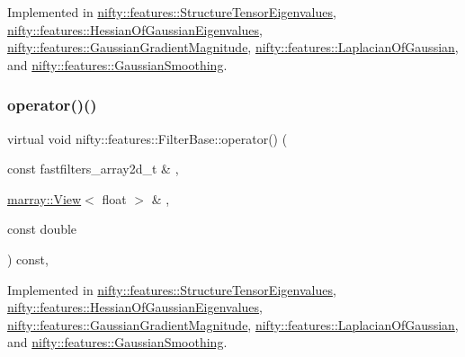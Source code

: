 Implemented in \hyperlink{structnifty_1_1features_1_1StructureTensorEigenvalues_aca7d1180adccc1ddbd657bfce7d349ac}{nifty\+::features\+::\+Structure\+Tensor\+Eigenvalues}, \hyperlink{structnifty_1_1features_1_1HessianOfGaussianEigenvalues_ab69872f7fb1e71080e1dc351610777ba}{nifty\+::features\+::\+Hessian\+Of\+Gaussian\+Eigenvalues}, \hyperlink{structnifty_1_1features_1_1GaussianGradientMagnitude_ab586b1dd5bd966f8622105fafb3029c8}{nifty\+::features\+::\+Gaussian\+Gradient\+Magnitude}, \hyperlink{structnifty_1_1features_1_1LaplacianOfGaussian_aaf34aa1ea6844c2166ed474db7e1b694}{nifty\+::features\+::\+Laplacian\+Of\+Gaussian}, and \hyperlink{structnifty_1_1features_1_1GaussianSmoothing_a83bb2660db022cc1d2d302ac41e187ba}{nifty\+::features\+::\+Gaussian\+Smoothing}.

\mbox{\label{structnifty_1_1features_1_1FilterBase_a17c77d36dd765c5ec0b163102428656c}} 
\subsubsection{\texorpdfstring{operator()()}{operator()()}\hspace{0.1cm}{\footnotesize\ttfamily [1/2]}}
{\footnotesize\ttfamily virtual void nifty\+::features\+::\+Filter\+Base\+::operator() (\begin{DoxyParamCaption}\item[{const fastfilters\+\_\+array2d\+\_\+t \&}]{,  }\item[{\hyperlink{classandres_1_1View}{marray\+::\+View}$<$ float $>$ \&}]{,  }\item[{const double}]{ }\end{DoxyParamCaption}) const\hspace{0.3cm}{\ttfamily [inline]}, {}}



Implemented in \hyperlink{structnifty_1_1features_1_1StructureTensorEigenvalues_a514f1f20f7535404e91ed6ddad56dffe}{nifty\+::features\+::\+Structure\+Tensor\+Eigenvalues}, \hyperlink{structnifty_1_1features_1_1HessianOfGaussianEigenvalues_a6195cb81a2b8a6570cb623e591c68781}{nifty\+::features\+::\+Hessian\+Of\+Gaussian\+Eigenvalues}, \hyperlink{structnifty_1_1features_1_1GaussianGradientMagnitude_a00efc1c411b58f0e212b26e3a4b9c06c}{nifty\+::features\+::\+Gaussian\+Gradient\+Magnitude}, \hyperlink{structnifty_1_1features_1_1LaplacianOfGaussian_a35537b627fd708494af6857ad5312e4b}{nifty\+::features\+::\+Laplacian\+Of\+Gaussian}, and \hyperlink{structnifty_1_1features_1_1GaussianSmoothing_a1b6bf85baa31180bad4070cc704b8723}{nifty\+::features\+::\+Gaussian\+Smoothing}.

